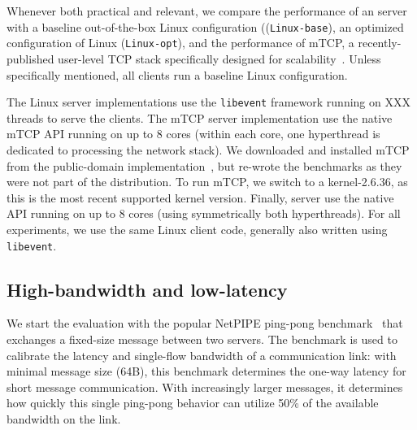 

Whenever both practical and relevant, we compare the performance of an
\ix server with a baseline out-of-the-box Linux configuration
((\texttt{Linux-base}), an optimized configuration of Linux
(\texttt{Linux-opt}), and the performance of mTCP, a
recently-published user-level TCP stack specifically designed for
scalability~\cite{jeong2014mtcp}.  Unless specifically mentioned, all
clients run a baseline Linux configuration. 

The Linux server implementations use the \texttt{libevent} framework
running on XXX threads to serve the clients. The mTCP server
implementation use the native mTCP API running on up to 8 cores
(within each core, one hyperthread is dedicated to processing the
network stack).  We downloaded and installed mTCP
from the public-domain implementation~\cite{url:mtcp}, but re-wrote the
benchmarks as they were not part of the distribution.  To run mTCP, we
switch to a kernel-2.6.36, as this is the most recent supported kernel
version.
Finally, \ix server use
the native \ix API running on up to 8 cores (using symmetrically both
hyperthreads).  For all experiments, we use the same Linux client code, generally also written using \texttt{libevent}.


\subsection{High-bandwidth and low-latency}
\label{sec:eval:netpipe}




We start the evaluation with the popular NetPIPE ping-pong
benchmark~\cite{snell1996netpipe} that exchanges a fixed-size message
between two servers.  The benchmark is used to calibrate the latency
and single-flow bandwidth of a communication link: with minimal
message size (64B), this benchmark determines the one-way latency for
short message communication.  With increasingly larger messages, it
determines how quickly this single ping-pong behavior can utilize 50\%
of the available bandwidth on the link.

